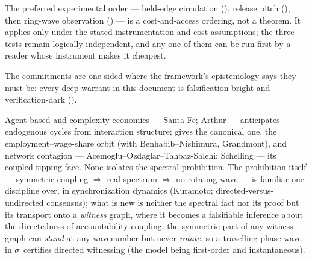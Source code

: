 \documentclass[../main]{subfiles}
\begin{document}
The preferred experimental order --- held-edge circulation (), release pitch
(), then ring-wave observation () --- is a cost-and-access
ordering, not a theorem. It applies only under the stated instrumentation and cost
assumptions; the three tests remain logically independent, and any one of them can be run
first by a reader whose instrument makes it cheapest.

The commitments are one-sided where the framework's epistemology says they must be:
every deep warrant in this document is falsification-bright and verification-dark
().

\begin{econ}[label=e:osc, title={The prohibition, transported to a witness graph}, ref=dyn:rot,
  cites={a:goodwin,a:contagion}, departs=annex,
  stopsat={the spectral fact is familiar; its transport onto a witness graph is not}]
  Agent-based and complexity economics --- Santa Fe; Arthur --- anticipates endogenous cycles
  from interaction structure; \textcite{a:goodwin} gives the canonical one, the
  employment--wage-share orbit (with Benhabib--Nishimura, Grandmont), and network contagion
  --- Acemoglu--Ozdaglar--Tahbaz-Salehi; Schelling \parencite{a:contagion} --- its
  coupled-tipping face. None isolates the spectral prohibition. The prohibition itself ---
  symmetric coupling $\Rightarrow$ real spectrum $\Rightarrow$ no rotating wave --- is
  familiar one discipline over, in synchronization dynamics (Kuramoto;
  directed-versus-undirected consensus); what is new is neither the spectral fact nor its
  proof but its transport onto a \emph{witness} graph, where it becomes a falsifiable
  inference about the directedness of accountability coupling: the symmetric part of any
  witness graph can \emph{stand} at any wavenumber but never \emph{rotate}, so a travelling
  phase-wave in $\sigma$ certifies directed witnessing (the model being first-order and
  instantaneous).
\end{econ}
\end{document}
